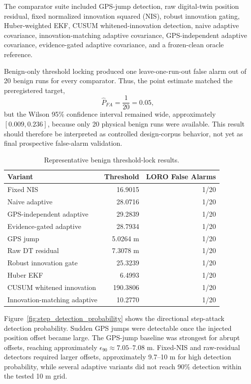 \documentclass[11pt,a4paper]{article}
\begin{document}
The comparator suite included GPS-jump detection, raw digital-twin position residual, fixed normalized innovation squared (NIS), robust innovation gating, Huber-weighted EKF, CUSUM whitened-innovation detection, naive adaptive covariance, innovation-matching adaptive covariance, GPS-independent adaptive covariance, evidence-gated adaptive covariance, and a frozen-clean oracle reference.

Benign-only threshold locking produced one leave-one-run-out false alarm out of 20 benign runs for every comparator. Thus, the point estimate matched the preregistered target,
\[
\hat{P}_{FA} = \frac{1}{20} = 0.05,
\]
but the Wilson 95\% confidence interval remained wide, approximately $[0.009, 0.236]$, because only 20 physical benign runs were available. This result should therefore be interpreted as controlled design-corpus behavior, not yet as final prospective false-alarm validation.

\begin{table}[t]
\centering
\caption{Representative benign threshold-lock results.}
\label{tab:threshold_lock_summary}
\begin{tabular}{lrr}
\hline
Variant & Threshold & LORO False Alarms \\
\hline
Fixed NIS & 16.9015 & 1/20 \\
Naive adaptive & 28.0716 & 1/20 \\
GPS-independent adaptive & 29.2839 & 1/20 \\
Evidence-gated adaptive & 28.7934 & 1/20 \\
GPS jump & 5.0264 m & 1/20 \\
Raw DT residual & 7.3078 m & 1/20 \\
Robust innovation gate & 25.3239 & 1/20 \\
Huber EKF & 6.4993 & 1/20 \\
CUSUM whitened innovation & 190.3806 & 1/20 \\
Innovation-matching adaptive & 10.2770 & 1/20 \\
\hline
\end{tabular}
\end{table}

Figure~\ref{fig:step_detection_probability} shows the directional step-attack detection probability. Sudden GPS jumps were detectable once the injected position offset became large. The GPS-jump baseline was strongest for abrupt offsets, reaching approximately $\epsilon_{90} \approx 7.05$--$7.08$ m. Fixed-NIS and raw-residual detectors required larger offsets, approximately 9.7--10 m for high detection probability, while several adaptive variants did not reach 90\% detection within the tested 10 m grid.
\end{document}
